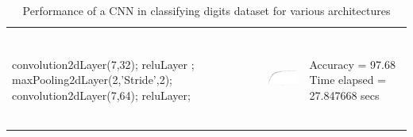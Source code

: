 \begin{table}[!htpb]
\begin{tabular}[t]{|>{\centering}p{6 cm}|p{4.8cm}|p{5.1cm}|}
		&&\\
		\vspace*{-2.8cm}
		convolution2dLayer(7,32); reluLayer ; 	maxPooling2dLayer(2,'Stride',2); convolution2dLayer(7,64); reluLayer; &  \includegraphics[height=3cm, width=4.4cm]{Exercise3/Report/accuracy_3_97_68} &  Accuracy = 97.68 \newline Time elapsed = 27.847668 secs\\ \hline
		
		
	\end{tabular}
	
	\captionsetup{format = hang}
	\caption{Performance of a CNN in classifying digits dataset for various architectures}
	\label{table:3.2}
\end{table}